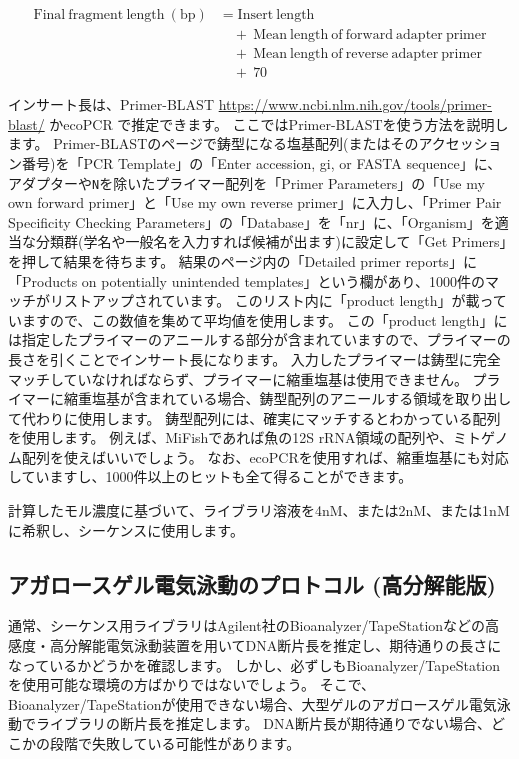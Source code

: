 \documentclass[titlepage,10pt,a4paper,uplatex]{jsbook}
\begin{document}
\begin{align*}
\mathrm{Final~fragment~length~(bp)} &= \mathrm{Insert~length} \\
            &\quad + \ \mathrm{Mean~length~of~forward~adapter~primer} \\
            &\quad + \ \mathrm{Mean~length~of~reverse~adapter~primer} \\
            &\quad + \ 70
\end{align*}

インサート長は、Primer-BLAST \url{https://www.ncbi.nlm.nih.gov/tools/primer-blast/} かecoPCR \citep{Bellemain2010}で推定できます。
ここではPrimer-BLASTを使う方法を説明します。
Primer-BLASTのページで鋳型になる塩基配列(またはそのアクセッション番号)を「PCR Template」の「Enter accession, gi, or FASTA sequence」に、アダプターや\texttt{N}を除いたプライマー配列を「Primer Parameters」の「Use my own forward primer」と「Use my own reverse primer」に入力し、「Primer Pair Specificity Checking Parameters」の「Database」を「nr」に、「Organism」を適当な分類群(学名や一般名を入力すれば候補が出ます)に設定して「Get Primers」を押して結果を待ちます。
結果のページ内の「Detailed primer reports」に「Products on potentially unintended templates」という欄があり、1000件のマッチがリストアップされています。
このリスト内に「product length」が載っていますので、この数値を集めて平均値を使用します。
この「product length」には指定したプライマーのアニールする部分が含まれていますので、プライマーの長さを引くことでインサート長になります。
入力したプライマーは鋳型に完全マッチしていなければならず、プライマーに縮重塩基は使用できません。
プライマーに縮重塩基が含まれている場合、鋳型配列のアニールする領域を取り出して代わりに使用します。
鋳型配列には、確実にマッチするとわかっている配列を使用します。
例えば、MiFishであれば魚の12S rRNA領域の配列や、ミトゲノム配列を使えばいいでしょう。
なお、ecoPCRを使用すれば、縮重塩基にも対応していますし、1000件以上のヒットも全て得ることができます。

計算したモル濃度に基づいて、ライブラリ溶液を4nM、または2nM、または1nMに希釈し、シーケンスに使用します。

\subsection{アガロースゲル電気泳動のプロトコル (高分解能版)}

通常、シーケンス用ライブラリはAgilent社のBioanalyzer/TapeStationなどの高感度・高分解能電気泳動装置を用いてDNA断片長を推定し、期待通りの長さになっているかどうかを確認します。
しかし、必ずしもBioanalyzer/TapeStationを使用可能な環境の方ばかりではないでしょう。
そこで、Bioanalyzer/TapeStationが使用できない場合、大型ゲルのアガロースゲル電気泳動でライブラリの断片長を推定します。
DNA断片長が期待通りでない場合、どこかの段階で失敗している可能性があります。
\end{document}
